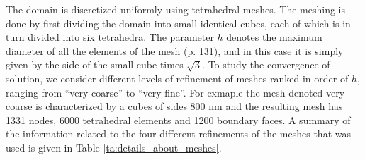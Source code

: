 The domain is discretized uniformly using tetrahedral meshes.
The meshing is done by first dividing the domain into small identical cubes,
each of which is in turn divided into six tetrahedra.
The parameter $h$ denotes the maximum diameter of all the elements of the 
mesh \cite{handbook} (p. 131), and in this case it is simply given by the side of 
the small cube times $\sqrt{3}$.
To study the convergence of solution, we consider different levels 
of refinement of meshes ranked in order of $h$,
ranging from ``very coarse'' to ``very fine''.
For exmaple the mesh denoted very coarse is characterized by a cubes of sides 
800 nm and the resulting mesh has 1331 nodes, 6000 tetrahedral elements and 
1200 boundary faces.
A summary of the information related to 
the four different refinements of the meshes that was used 
is given in Table \ref{ta:details_about_meshes}.


